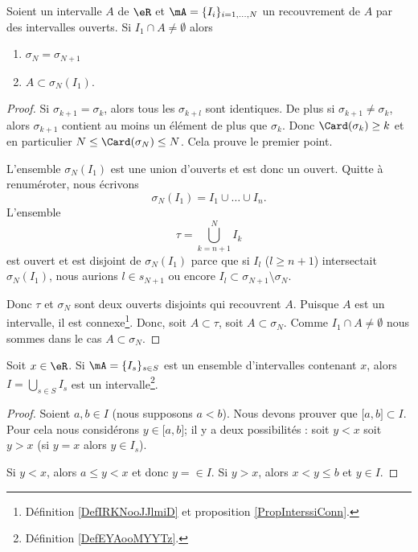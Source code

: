 \begin{lemma}       \label{LEMooJHMTooXwxSAa}
	Soient un intervalle \( A\) de \( \eR\) et \( \mA=\{ I_i \}_{i=1,\ldots, N}\) un recouvrement de \( A\) par des intervalles ouverts. Si \( I_1\cap A\neq \emptyset\) alors
	\begin{enumerate}
		\item
		      \( \sigma_{N}=\sigma_{N+1}\)
		\item
		      \( A\subset \sigma_N(I_1)\).
	\end{enumerate}
\end{lemma}

\begin{proof}
	Si \( \sigma_{k+1}=\sigma_k\), alors tous les \( \sigma_{k+l}\) sont identiques. De plus si \( \sigma_{k+1}\neq \sigma_k\), alors \( \sigma_{k+1}\) contient au moins un élément de plus que \( \sigma_k\). Donc \( \Card(\sigma_k)\geq k\) et en particulier \( N\leq \Card(\sigma_N)\leq N\). Cela prouve le premier point.

	L'ensemble \( \sigma_N(I_1)\) est une union d'ouverts et est donc un ouvert. Quitte à renuméroter, nous écrivons
	\begin{equation}
		\sigma_N(I_1)=I_1\cup \ldots \cup I_n.
	\end{equation}
	L'ensemble
	\begin{equation}
		\tau=\bigcup_{k=n+1}^NI_k
	\end{equation}
	est ouvert et est disjoint de \( \sigma_N(I_1)\) parce que si \( I_l\) (\( l\geq n+1\)) intersectait \( \sigma_N(I_1)\), nous aurions \( l\in s_{N+1}\) ou encore \( I_l\subset \sigma_{N+1}\setminus\sigma_N\).

	Donc \( \tau\) et \( \sigma_N\) sont deux ouverts disjoints qui recouvrent \( A\). Puisque \( A\) est un intervalle, il est connexe\footnote{Définition \ref{DefIRKNooJJlmiD} et proposition \ref{PropInterssiConn}.}. Donc, soit \( A\subset \tau\), soit \( A\subset \sigma_N\). Comme \( I_1\cap A\neq \emptyset\) nous sommes dans le cas \( A\subset \sigma_N\).
\end{proof}

\begin{lemma}       \label{LEMooGHPTooKgFvGb}
	Soit \( x\in \eR\). Si \( \mA=\{ I_s \}_{s\in S}\) est un ensemble d'intervalles contenant \( x\), alors \( I=\bigcup_{s\in S}I_s\) est un intervalle\footnote{Définition \ref{DefEYAooMYYTz}.}.
\end{lemma}

\begin{proof}
	Soient \( a,b\in I \) (nous supposons \( a<b\)). Nous devons prouver que \( \mathopen[ a , b \mathclose]\subset I\). Pour cela nous considérons \( y\in \mathopen[ a , b \mathclose]\); il y a deux possibilités : soit \( y<x\) soit \( y>x\) (si \( y=x\) alors \( y\in I_s\)).

	Si \( y<x\), alors \( a\leq y<x\) et donc \( y=\in I\). Si \( y>x\), alors \( x<y\leq b\) et \( y\in I\).
\end{proof}

